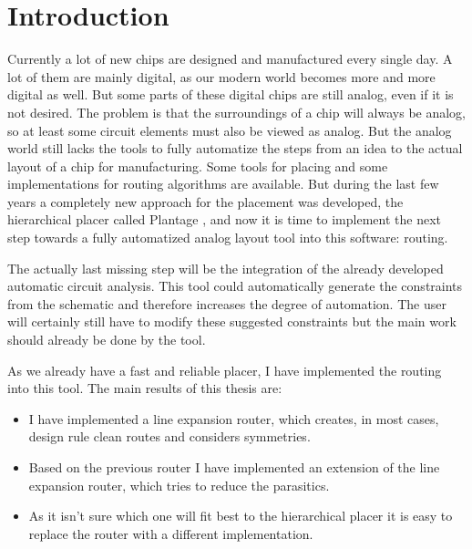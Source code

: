 \chapter{Introduction}

Currently a lot of new chips are designed and manufactured every single day. A lot of them are mainly digital, as our modern world becomes more and more digital as well. But some parts of these digital chips are still analog, even if it is not desired. The problem is that the surroundings of a chip will always be analog, so at least some circuit elements must also be viewed as analog. But the analog world still lacks the tools to fully automatize the steps from an idea to the actual layout of a chip for manufacturing. Some tools for placing and some implementations for routing algorithms are available. But during the last few years a completely new approach for the placement was developed, the hierarchical placer called Plantage \cite{iccad:plantage}, and now it is time to implement the next step towards a fully automatized analog layout tool into this software: routing.

The actually last missing step will be the integration of the already developed automatic circuit analysis. This tool could automatically generate the constraints from the schematic and therefore increases the degree of automation. The user will certainly still have to modify these suggested constraints but the main work should already be done by the tool.

As we already have a fast and reliable placer, I have implemented the routing into this tool. The main results of this thesis are:
\begin{itemize}
\item I have implemented a line expansion router, which creates, in most cases, design rule clean routes and considers symmetries.
\item Based on the previous router I have implemented an extension of the line expansion router, which tries to reduce the parasitics.
\item As it isn't sure which one will fit best to the hierarchical placer it is easy to replace the router with a different implementation.
\end{itemize}